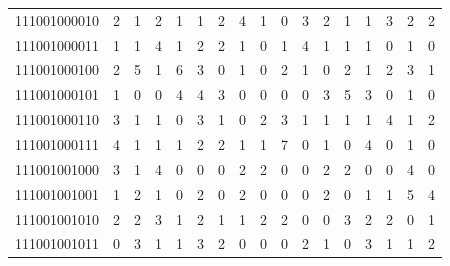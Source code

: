 \documentclass[10pt,a4paper]{article}
\begin{document}
\begin{longtable}{ |c|c|c|c|c|c|c|c|c|c|c|c|c|c|c|c|c| }
    111001000010              & 2                            & 1                                & 2                            & 1                              & 1   & 2   & 4   & 1   & 0   & 3   & 2   & 1   & 1   & 3   & 2   & 2   \\
    111001000011              & 1                            & 1                                & 4                            & 1                              & 2   & 2   & 1   & 0   & 1   & 4   & 1   & 1   & 1   & 0   & 1   & 0   \\
    111001000100              & 2                            & 5                                & 1                            & 6                              & 3   & 0   & 1   & 0   & 2   & 1   & 0   & 2   & 1   & 2   & 3   & 1   \\
    111001000101              & 1                            & 0                                & 0                            & 4                              & 4   & 3   & 0   & 0   & 0   & 0   & 3   & 5   & 3   & 0   & 1   & 0   \\
    111001000110              & 3                            & 1                                & 1                            & 0                              & 3   & 1   & 0   & 2   & 3   & 1   & 1   & 1   & 1   & 4   & 1   & 2   \\
    111001000111              & 4                            & 1                                & 1                            & 1                              & 2   & 2   & 1   & 1   & 7   & 0   & 1   & 0   & 4   & 0   & 1   & 0   \\
    111001001000              & 3                            & 1                                & 4                            & 0                              & 0   & 0   & 2   & 2   & 0   & 0   & 2   & 2   & 0   & 0   & 4   & 0   \\
    111001001001              & 1                            & 2                                & 1                            & 0                              & 2   & 0   & 2   & 0   & 0   & 0   & 2   & 0   & 1   & 1   & 5   & 4   \\
    111001001010              & 2                            & 2                                & 3                            & 1                              & 2   & 1   & 1   & 2   & 2   & 0   & 0   & 3   & 2   & 2   & 0   & 1   \\
    111001001011              & 0                            & 3                                & 1                            & 1                              & 3   & 2   & 0   & 0   & 0   & 2   & 1   & 0   & 3   & 1   & 1   & 2   \\

\end{longtable}
\end{document}
